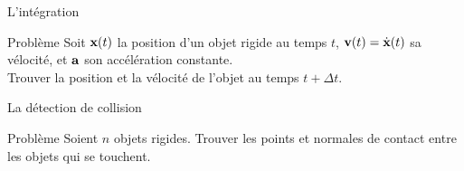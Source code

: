 \begin{frame}{L'intégration}
    \begin{block}{Problème}
        Soit $\textbf{x}(t)$ la position d’un objet rigide au temps $t$, $\textbf{v}(t) =
        \dot{\textbf{x}}(t)$ sa vélocité, et ${\bf a}$ son accélération constante.\\
        Trouver la position et la vélocité de l’objet au temps $t + \Delta t$.
    \end{block}
\end{frame}

\begin{frame}{La détection de collision}
    \begin{block}{Problème}
        Soient $n$ objets rigides. Trouver les points et normales de contact
        entre les objets qui se touchent.
    \end{block}
\end{frame}

